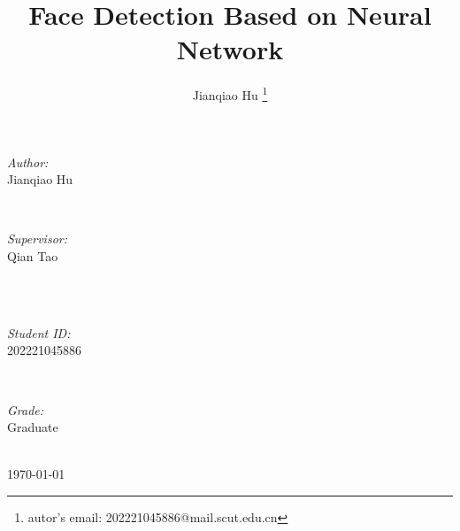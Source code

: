 \documentclass[journal, a4paper]{IEEEtran}
\begin{document}
\begin{titlepage}
\begin{minipage}{0.4\textwidth}
\begin{flushleft} \large
\emph{Author:}\\
Jianqiao Hu %
\end{flushleft}
\end{minipage}
~
\begin{minipage}{0.4\textwidth}
\begin{flushright} \large
\emph{Supervisor:} \\
Qian Tao %
\end{flushright}
\end{minipage}\\[2cm]
~
\begin{minipage}{0.4\textwidth}
\begin{flushleft} \large
\emph{Student ID:}\\
202221045886
\end{flushleft}
\end{minipage}
~
\begin{minipage}{0.4\textwidth}
\begin{flushright} \large
\emph{Grade:} \\
Graduate
\end{flushright}
\end{minipage}\\[2cm]



{\large \today}\\[2cm] %

 

\vfill %

\end{titlepage}


	\title{Face Detection Based on Neural Network}
	\author{Jianqiao Hu \thanks{autor's email: 202221045886@mail.scut.edu.cn}}
	\maketitle
\end{document}
